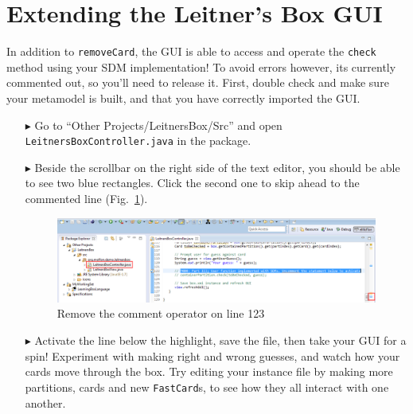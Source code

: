 \newpage
\section{Extending the Leitner's Box GUI}
\genHeader

\vspace{0.5cm}

In addition to \texttt{removeCard}, the GUI is able to access and operate the \texttt{check} method using your SDM implementation! To avoid errors however, its
currently commented out, so you'll need to release it. First, double check and make sure your metamodel is built, and that you have correctly imported the GUI.

\begin{itemize}

\item[$\blacktriangleright$] Go to ``Other Projects/LeitnersBox/Src'' and open \texttt{Leitners\-Box\-Cont\-roller\-.java} in the package.

\vspace{0.5cm}

\item[$\blacktriangleright$] Beside the scrollbar on the right side of the text editor, you should be able to see two blue rectangles. Click the second one
to skip ahead to the commented line (Fig.~\ref{fig:remComment}).

\vspace{0.5cm}

\begin{figure}[htp]
\begin{center}
  \includegraphics[width=\textwidth]{eclipse_GUICommentLine}
  \caption{Remove the comment operator on line 123}
  \label{fig:remComment}
\end{center}
\end{figure}

\vspace{0.5cm}

\item[$\blacktriangleright$] Activate the line below the highlight, save the file, then take your GUI for a spin! Experiment with
making right and wrong guesses, and watch how your cards move through the box. Try editing your instance file by making more partitions, cards and
new \texttt{FastCard}s, to see how they all interact with one another.

\end{itemize}
